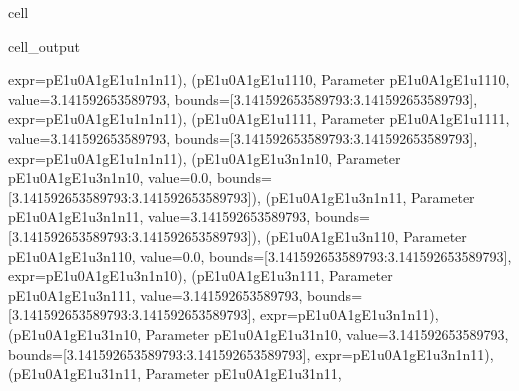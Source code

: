 \documentclass[letterpaper,table,10pt,english]{jupyterBook}
\begin{document}
\begin{sphinxuseclass}{cell}
\begin{sphinxVerbatimOutput}
\begin{sphinxuseclass}{cell_output}
\begin{sphinxVerbatim}[commandchars=\\\{\}]
expr=\PYGZsq{}p\PYGZus{}E1u\PYGZus{}0\PYGZus{}A1g\PYGZus{}E1u\PYGZus{}1\PYGZus{}n1\PYGZus{}n1\PYGZus{}1\PYGZsq{}\PYGZgt{}), (\PYGZsq{}p\PYGZus{}E1u\PYGZus{}0\PYGZus{}A1g\PYGZus{}E1u\PYGZus{}1\PYGZus{}1\PYGZus{}1\PYGZus{}0\PYGZsq{}, \PYGZlt{}Parameter \PYGZsq{}p\PYGZus{}E1u\PYGZus{}0\PYGZus{}A1g\PYGZus{}E1u\PYGZus{}1\PYGZus{}1\PYGZus{}1\PYGZus{}0\PYGZsq{}, value=3.141592653589793, bounds=[\PYGZhy{}3.141592653589793:3.141592653589793], expr=\PYGZsq{}p\PYGZus{}E1u\PYGZus{}0\PYGZus{}A1g\PYGZus{}E1u\PYGZus{}1\PYGZus{}n1\PYGZus{}n1\PYGZus{}1\PYGZsq{}\PYGZgt{}), (\PYGZsq{}p\PYGZus{}E1u\PYGZus{}0\PYGZus{}A1g\PYGZus{}E1u\PYGZus{}1\PYGZus{}1\PYGZus{}1\PYGZus{}1\PYGZsq{}, \PYGZlt{}Parameter \PYGZsq{}p\PYGZus{}E1u\PYGZus{}0\PYGZus{}A1g\PYGZus{}E1u\PYGZus{}1\PYGZus{}1\PYGZus{}1\PYGZus{}1\PYGZsq{}, value=3.141592653589793, bounds=[\PYGZhy{}3.141592653589793:3.141592653589793], expr=\PYGZsq{}p\PYGZus{}E1u\PYGZus{}0\PYGZus{}A1g\PYGZus{}E1u\PYGZus{}1\PYGZus{}n1\PYGZus{}n1\PYGZus{}1\PYGZsq{}\PYGZgt{}), (\PYGZsq{}p\PYGZus{}E1u\PYGZus{}0\PYGZus{}A1g\PYGZus{}E1u\PYGZus{}3\PYGZus{}n1\PYGZus{}n1\PYGZus{}0\PYGZsq{}, \PYGZlt{}Parameter \PYGZsq{}p\PYGZus{}E1u\PYGZus{}0\PYGZus{}A1g\PYGZus{}E1u\PYGZus{}3\PYGZus{}n1\PYGZus{}n1\PYGZus{}0\PYGZsq{}, value=0.0, bounds=[\PYGZhy{}3.141592653589793:3.141592653589793]\PYGZgt{}), (\PYGZsq{}p\PYGZus{}E1u\PYGZus{}0\PYGZus{}A1g\PYGZus{}E1u\PYGZus{}3\PYGZus{}n1\PYGZus{}n1\PYGZus{}1\PYGZsq{}, \PYGZlt{}Parameter \PYGZsq{}p\PYGZus{}E1u\PYGZus{}0\PYGZus{}A1g\PYGZus{}E1u\PYGZus{}3\PYGZus{}n1\PYGZus{}n1\PYGZus{}1\PYGZsq{}, value=3.141592653589793, bounds=[\PYGZhy{}3.141592653589793:3.141592653589793]\PYGZgt{}), (\PYGZsq{}p\PYGZus{}E1u\PYGZus{}0\PYGZus{}A1g\PYGZus{}E1u\PYGZus{}3\PYGZus{}n1\PYGZus{}1\PYGZus{}0\PYGZsq{}, \PYGZlt{}Parameter \PYGZsq{}p\PYGZus{}E1u\PYGZus{}0\PYGZus{}A1g\PYGZus{}E1u\PYGZus{}3\PYGZus{}n1\PYGZus{}1\PYGZus{}0\PYGZsq{}, value=0.0, bounds=[\PYGZhy{}3.141592653589793:3.141592653589793], expr=\PYGZsq{}p\PYGZus{}E1u\PYGZus{}0\PYGZus{}A1g\PYGZus{}E1u\PYGZus{}3\PYGZus{}n1\PYGZus{}n1\PYGZus{}0\PYGZsq{}\PYGZgt{}), (\PYGZsq{}p\PYGZus{}E1u\PYGZus{}0\PYGZus{}A1g\PYGZus{}E1u\PYGZus{}3\PYGZus{}n1\PYGZus{}1\PYGZus{}1\PYGZsq{}, \PYGZlt{}Parameter \PYGZsq{}p\PYGZus{}E1u\PYGZus{}0\PYGZus{}A1g\PYGZus{}E1u\PYGZus{}3\PYGZus{}n1\PYGZus{}1\PYGZus{}1\PYGZsq{}, value=3.141592653589793, bounds=[\PYGZhy{}3.141592653589793:3.141592653589793], expr=\PYGZsq{}p\PYGZus{}E1u\PYGZus{}0\PYGZus{}A1g\PYGZus{}E1u\PYGZus{}3\PYGZus{}n1\PYGZus{}n1\PYGZus{}1\PYGZsq{}\PYGZgt{}), (\PYGZsq{}p\PYGZus{}E1u\PYGZus{}0\PYGZus{}A1g\PYGZus{}E1u\PYGZus{}3\PYGZus{}1\PYGZus{}n1\PYGZus{}0\PYGZsq{}, \PYGZlt{}Parameter \PYGZsq{}p\PYGZus{}E1u\PYGZus{}0\PYGZus{}A1g\PYGZus{}E1u\PYGZus{}3\PYGZus{}1\PYGZus{}n1\PYGZus{}0\PYGZsq{}, value=3.141592653589793, bounds=[\PYGZhy{}3.141592653589793:3.141592653589793], expr=\PYGZsq{}p\PYGZus{}E1u\PYGZus{}0\PYGZus{}A1g\PYGZus{}E1u\PYGZus{}3\PYGZus{}n1\PYGZus{}n1\PYGZus{}1\PYGZsq{}\PYGZgt{}), (\PYGZsq{}p\PYGZus{}E1u\PYGZus{}0\PYGZus{}A1g\PYGZus{}E1u\PYGZus{}3\PYGZus{}1\PYGZus{}n1\PYGZus{}1\PYGZsq{}, \PYGZlt{}Parameter \PYGZsq{}p\PYGZus{}E1u\PYGZus{}0\PYGZus{}A1g\PYGZus{}E1u\PYGZus{}3\PYGZus{}1\PYGZus{}n1\PYGZus{}1\PYGZsq{}, 
\end{sphinxVerbatim}
\end{sphinxuseclass}
\end{sphinxVerbatimOutput}
\end{sphinxuseclass}
\end{document}

